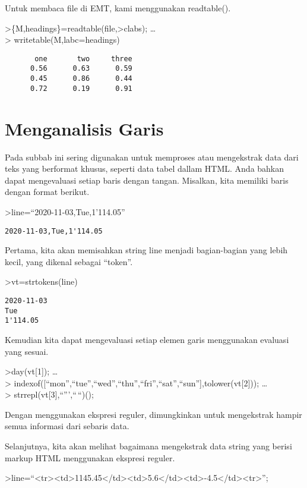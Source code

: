 \documentclass[
]{book}
\begin{document}
Untuk membaca file di EMT, kami menggunakan readtable().

\textgreater\{M,headings\}=readtable(file,\textgreater clabs); \ldots{}\\
\textgreater{} writetable(M,labc=headings)

\begin{verbatim}
       one       two     three
      0.56      0.63      0.59
      0.45      0.86      0.44
      0.72      0.19      0.91
\end{verbatim}

\chapter{Menganalisis Garis}\label{menganalisis-garis}

Pada subbab ini sering digunakan untuk memproses atau mengekstrak data dari teks yang berformat khusus, seperti data tabel dallam HTML. Anda bahkan dapat mengevaluasi setiap baris dengan tangan. Misalkan, kita memiliki baris dengan format berikut.

\textgreater line=``2020-11-03,Tue,1'114.05''

\begin{verbatim}
2020-11-03,Tue,1'114.05
\end{verbatim}

Pertama, kita akan memisahkan string line menjadi bagian-bagian yang lebih kecil, yang dikenal sebagai ``token''.

\textgreater vt=strtokens(line)

\begin{verbatim}
2020-11-03
Tue
1'114.05
\end{verbatim}

Kemudian kita dapat mengevaluasi setiap elemen garis menggunakan evaluasi yang sesuai.

\textgreater day(vt{[}1{]}); \ldots{}\\
\textgreater{} indexof({[}``mon'',``tue'',``wed'',``thu'',``fri'',``sat'',``sun''{]},tolower(vt{[}2{]})); \ldots{}\\
\textgreater{} strrepl(vt{[}3{]},``''',``\,``)();

Dengan menggunakan ekspresi reguler, dimungkinkan untuk mengekstrak hampir semua informasi dari sebaris data.

Selanjutnya, kita akan melihat bagaimana mengekstrak data string yang berisi markup HTML menggunakan ekspresi reguler.

\textgreater line=``\textless tr\textgreater\textless td\textgreater1145.45\textless/td\textgreater\textless td\textgreater5.6\textless/td\textgreater\textless td\textgreater-4.5\textless/td\textgreater\textless tr\textgreater{}'';
\end{document}

